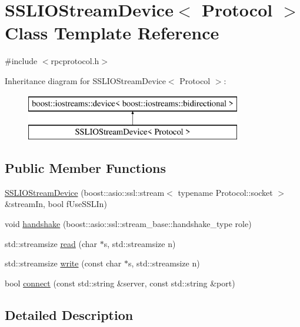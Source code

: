 \hypertarget{class_s_s_l_i_o_stream_device}{}\section{S\+S\+L\+I\+O\+Stream\+Device$<$ Protocol $>$ Class Template Reference}
\label{class_s_s_l_i_o_stream_device}


{\ttfamily \#include $<$rpcprotocol.\+h$>$}

Inheritance diagram for S\+S\+L\+I\+O\+Stream\+Device$<$ Protocol $>$\+:\begin{figure}[H]
\begin{center}
\leavevmode
\includegraphics[height=2.000000cm]{class_s_s_l_i_o_stream_device}
\end{center}
\end{figure}
\subsection*{Public Member Functions}
\begin{DoxyCompactItemize}
\item 
\hyperlink{class_s_s_l_i_o_stream_device_a603e5709babdeaaa68c159a2895d7f2e}{S\+S\+L\+I\+O\+Stream\+Device} (boost\+::asio\+::ssl\+::stream$<$ typename Protocol\+::socket $>$ \&stream\+In, bool f\+Use\+S\+S\+L\+In)
\item 
void \hyperlink{class_s_s_l_i_o_stream_device_a6607d02de410f1c731bf1dcf3bac9bb5}{handshake} (boost\+::asio\+::ssl\+::stream\+\_\+base\+::handshake\+\_\+type role)
\item 
std\+::streamsize \hyperlink{class_s_s_l_i_o_stream_device_a8beb626f163adac311a5ec507c3e495a}{read} (char $\ast$s, std\+::streamsize n)
\item 
std\+::streamsize \hyperlink{class_s_s_l_i_o_stream_device_aa4bfad893484ffdf9dbcdce97c462ad0}{write} (const char $\ast$s, std\+::streamsize n)
\item 
bool \hyperlink{class_s_s_l_i_o_stream_device_acdded14a6c79e263989ebf8aea392405}{connect} (const std\+::string \&server, const std\+::string \&port)
\end{DoxyCompactItemize}


\subsection{Detailed Description}
